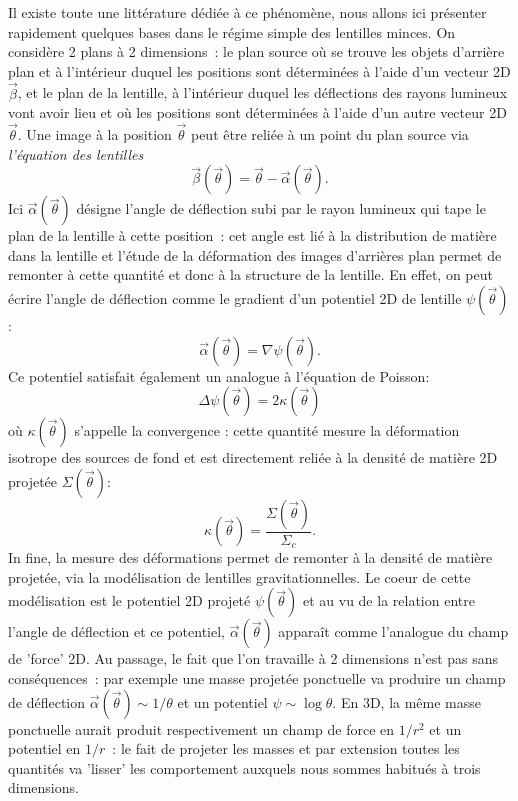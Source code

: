 Il existe toute une littérature dédiée à ce phénomène, nous allons ici présenter rapidement quelques bases dans le régime simple des lentilles minces. On considère 2 plans à 2 dimensions~: le plan source où se trouve les objets d'arrière plan et à l'intérieur duquel les positions sont déterminées à l'aide d'un vecteur 2D $\vec{\beta}$, et le plan de la lentille, à l'intérieur duquel les déflections des rayons lumineux vont avoir lieu et où les positions sont déterminées à l'aide d'un autre vecteur 2D $\vec{\theta}$. Une image à la position $\vec{\theta}$ peut être reliée à un point du plan source via \textit{l'équation des lentilles}
\begin{equation}
\vec{\beta}(\vec{\theta})=\vec{\theta}-\vec{\alpha}(\vec{\theta}).
\end{equation}
Ici $\vec{\alpha}(\vec{\theta})$ désigne l'angle de déflection subi par le rayon lumineux qui tape le plan de la lentille à cette position~: cet angle est lié à la distribution de matière dans la lentille et l'étude de la déformation des images d'arrières plan permet de remonter à cette quantité et donc à la structure de la lentille. En effet, on peut écrire l'angle de déflection comme le gradient d'un potentiel 2D de lentille $\psi(\vec{\theta})$:
\begin{equation}
\vec{\alpha}(\vec{\theta})=\nabla \psi(\vec{\theta}).
\end{equation}
Ce potentiel satisfait également un analogue à l'équation de Poisson:
\begin{equation}
\Delta \psi(\vec{\theta}) = 2 \kappa (\vec{\theta})
\end{equation}
où $\kappa (\vec{\theta})$ s'appelle la convergence : cette quantité mesure la déformation isotrope des sources de fond et est directement reliée à la densité de matière 2D projetée $\Sigma(\vec{\theta})$:
\begin{equation}
\kappa (\vec{\theta}) =\frac{\Sigma(\vec{\theta})}{\Sigma_c}.
\end{equation}
In fine, la mesure des déformations permet de remonter à la densité de matière projetée, via la modélisation de lentilles gravitationnelles. Le coeur de cette modélisation est le potentiel 2D projeté $\psi(\vec{\theta})$ et au vu de la relation entre l'angle de déflection et ce potentiel, $\vec{\alpha}(\vec{\theta})$ apparaît comme l'analogue du champ de 'force' 2D. Au passage, le fait que l'on travaille à 2 dimensions n'est pas sans conséquences~: par exemple une masse projetée ponctuelle va produire un champ de déflection $\vec{\alpha}(\vec{\theta})\sim 1/\theta$ et un potentiel $\psi \sim \log \theta$. En 3D, la même masse ponctuelle aurait produit respectivement un champ de force en $1/r^2$ et un potentiel en $1/r$~: le fait de projeter les masses et par extension toutes les quantités va 'lisser' les comportement auxquels nous sommes habitués à trois dimensions.
